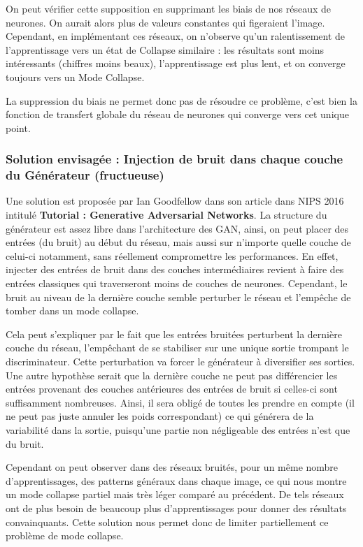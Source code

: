 On peut vérifier cette supposition en supprimant les biais de nos réseaux de neurones. On aurait alors plus de valeurs constantes qui figeraient l'image. Cependant, en implémentant ces réseaux, on n'observe qu'un ralentissement de l'apprentissage vers un état de Collapse similaire : les résultats sont moins intéressants (chiffres moins beaux), l'apprentissage est plus lent, et on converge toujours vers un Mode Collapse.

La suppression du biais ne permet donc pas de résoudre ce problème, c'est bien la fonction de transfert globale du réseau de neurones qui converge vers cet unique point.  


\subsubsection{Solution envisagée : Injection de bruit dans chaque couche du Générateur (fructueuse)}

Une solution est proposée par Ian Goodfellow dans son article dans NIPS 2016 intitulé \textbf{Tutorial : Generative Adversarial Networks}. La structure du générateur est assez libre dans l'architecture des GAN, ainsi, on peut placer des entrées (du bruit) au début du réseau, mais aussi sur n'importe quelle couche de celui-ci notamment, sans réellement compromettre les performances. En effet, injecter des entrées de bruit dans des couches intermédiaires revient à faire des entrées classiques qui traverseront moins de couches de neurones. Cependant, le bruit au niveau de la dernière couche semble perturber le réseau et l'empêche de tomber dans un mode collapse. 

Cela peut s'expliquer par le fait que les entrées bruitées perturbent la dernière couche du réseau, l'empêchant de se stabiliser sur une unique sortie trompant le discriminateur. Cette perturbation va forcer le générateur à diversifier ses sorties.
Une autre hypothèse serait que la dernière couche ne peut pas différencier les entrées provenant des couches antérieures des entrées de bruit si celles-ci sont suffisamment nombreuses. Ainsi, il sera obligé de toutes les prendre en compte (il ne peut pas juste annuler les poids correspondant) ce qui générera de la variabilité dans la sortie, puisqu'une partie non négligeable des entrées n'est que du bruit.

Cependant on peut observer dans des réseaux bruités, pour un même nombre d'apprentissages, des patterns généraux dans chaque image, ce qui nous montre un mode collapse partiel mais très léger comparé au précédent. De tels réseaux ont de plus besoin de beaucoup plus d'apprentissages pour donner des résultats convainquants. Cette solution nous permet donc de limiter partiellement ce problème de mode collapse.




